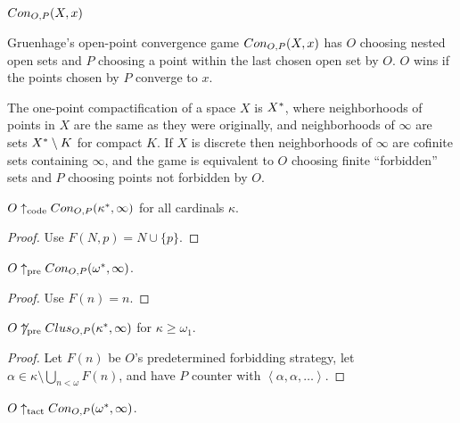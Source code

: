 



\centerline{\bf $Con_{O,P}(X,x)$}

\begin{definition} 
Gruenhage's open-point convergence game $Con_{O,P}(X,x)$ has $O$ choosing nested open sets and $P$ choosing a point within the last chosen open set by $O$. $O$ wins if the points chosen by $P$ converge to $x$.
\end{definition}

\begin{definition}
The one-point compactification of a space $X$ is $X^*$, where neighborhoods of points in $X$ are the same as they were originally, and neighborhoods of $\infty$ are sets $X^*\setminus K$ for compact $K$. If $X$ is discrete then neighborhoods of $\infty$ are cofinite sets containing $\infty$, and the game is equivalent to $O$ choosing finite ``forbidden'' sets and $P$ choosing points not forbidden by $O$.
\end{definition}

\begin{proposition}
$O\uparrow_{\text{code}} Con_{O,P}(\kappa^*,\infty)$ for all cardinals $\kappa$.
\end{proposition}

\begin{proof}
Use $F(N,p)=N\cup\{p\}$.
\end{proof}

\begin{proposition}
$O\uparrow_{\text{pre}} Con_{O,P}(\omega^*,\infty)$.
\end{proposition}

\begin{proof}
Use $F(n)=n$.
\end{proof}


\begin{proposition}
$O\not\uparrow_{\text{pre}} Clus_{O,P}(\kappa^*,\infty)$ for $\kappa\geq\omega_1$.
\end{proposition}

\begin{proof}
Let $F(n)$ be $O$'s predetermined forbidding strategy, let $\alpha\in\kappa\setminus\bigcup_{n<\omega}F(n)$, and have $P$ counter with $\left<\alpha,\alpha,\dots\right>$.
\end{proof}


\begin{proposition}
$O\uparrow_{\text{tact}}Con_{O,P}(\omega^*,\infty)$.
\end{proposition}

